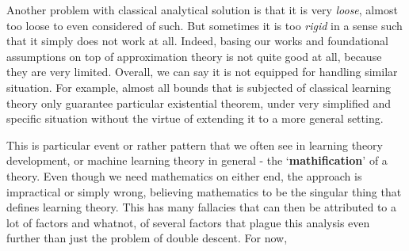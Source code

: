 \documentclass[10pt]{article} %
\begin{document}
Another problem with classical analytical solution is that it is very \textit{loose}, almost too loose to even considered of such. But sometimes it is too \textit{rigid} in a sense such that it simply does not work at all. Indeed, basing our works and foundational assumptions on top of approximation theory is not quite good at all, because they are very limited. Overall, we can say it is not equipped for handling similar situation. For example, almost all bounds that is subjected of classical learning theory only guarantee particular existential theorem, under very simplified and specific situation without the virtue of extending it to a more general setting. 

This is particular event or rather pattern that we often see in learning theory development, or machine learning theory in general - the `\textbf{mathification}' of a theory. Even though we need mathematics on either end, the approach is impractical or simply wrong, believing mathematics to be the singular thing that defines learning theory. This has many fallacies that can then be attributed to a lot of factors and whatnot, of several factors that plague this analysis even further than just the problem of double descent. For now, 
\end{document}
